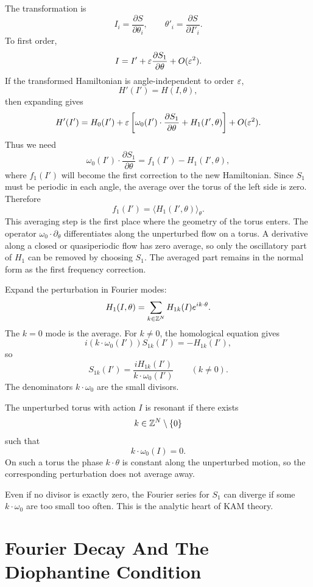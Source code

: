 The transformation is
\[
  I_i=\frac{\partial S}{\partial \theta_i},
  \qquad
  \theta'_i=\frac{\partial S}{\partial I'_i}.
\]
To first order,
\[
  I=I'+\varepsilon\frac{\partial S_1}{\partial \theta}+O(\varepsilon^2).
\]
If the transformed Hamiltonian is angle-independent to order \(\varepsilon\),
\[
  H'(I')=H(I,\theta),
\]
then expanding gives
\[
  H'(I')
  =
  H_0(I')
  +
  \varepsilon\left[
    \omega_0(I')\cdot\frac{\partial S_1}{\partial \theta}
    +
    H_1(I',\theta)
  \right]
  +
  O(\varepsilon^2).
\]
Thus we need
\[
  \omega_0(I')\cdot\frac{\partial S_1}{\partial \theta}
  =
  f_1(I')-H_1(I',\theta),
\]
where \(f_1(I')\) will become the first correction to the new Hamiltonian.
Since \(S_1\) must be periodic in each angle, the average over the torus of the
left side is zero. Therefore
\[
  f_1(I')=\langle H_1(I',\theta)\rangle_\theta.
\]
This averaging step is the first place where the geometry of the torus enters.
The operator \(\omega_0\cdot\partial_\theta\) differentiates along the
unperturbed flow on a torus.  A derivative along a closed or quasiperiodic
flow has zero average, so only the oscillatory part of \(H_1\) can be removed
by choosing \(S_1\).  The averaged part remains in the normal form as the first
frequency correction.

Expand the perturbation in Fourier modes:
\[
  H_1(I,\theta)=\sum_{k\in\mathbb{Z}^N} H_{1k}(I)e^{ik\cdot\theta}.
\]
The \(k=0\) mode is the average. For \(k\neq0\), the homological equation gives
\[
  i(k\cdot\omega_0(I'))S_{1k}(I')=-H_{1k}(I'),
\]
so
\[
  \boxed{
  S_{1k}(I')
  =
  \frac{iH_{1k}(I')}{k\cdot\omega_0(I')}
  \qquad (k\neq0).
  }
\]
The denominators \(k\cdot\omega_0\) are the small divisors.

\begin{definition}
The unperturbed torus with action \(I\) is resonant if there exists
\[
  k\in\mathbb{Z}^N\setminus\{0\}
\]
such that
\[
  k\cdot\omega_0(I)=0.
\]
On such a torus the phase \(k\cdot\theta\) is constant along the unperturbed
motion, so the corresponding perturbation does not average away.
\end{definition}

Even if no divisor is exactly zero, the Fourier series for \(S_1\) can diverge
if some \(k\cdot\omega_0\) are too small too often. This is the analytic heart
of KAM theory.

\section{Fourier Decay And The Diophantine Condition}
\label{sec:diophantine-condition}

